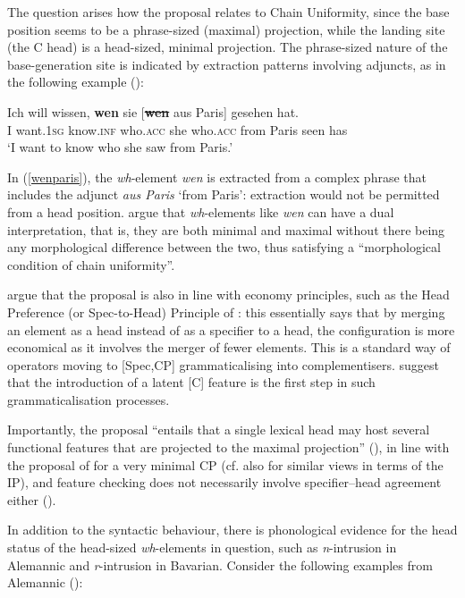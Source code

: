 The question arises how the proposal relates to Chain Uniformity, since the base position seems to be a phrase-sized (maximal) projection, while the landing site (the C head) is a head-sized, minimal projection. The phrase-sized nature of the base-generation site is indicated by extraction patterns involving adjuncts, as in the following example (\citealt[90, ex. 9]{bayerbrandner2008}):

\ea \gll Ich will wissen, \textbf{wen} sie [\sout{\textbf{wen}} aus Paris] gesehen hat. \label{wenparis}\\
I want.\textsc{1sg} know.\textsc{inf} who.\textsc{acc} she \phantom{[}who.\textsc{acc} from Paris seen has\\
\glt `I want to know who she saw from Paris.'
\z

In (\ref{wenparis}), the \textit{wh}-element \textit{wen} is extracted from a complex phrase that includes the adjunct \textit{aus Paris} `from Paris': extraction would not be permitted from a head position. \citet[90--91]{bayerbrandner2008} argue that \textit{wh}-elements like \textit{wen} can have a dual interpretation, that is, they are both minimal and maximal without there being any morphological difference between the two, thus satisfying a ``morphological condition of chain uniformity''.

\citet[91]{bayerbrandner2008} argue that the proposal is also in line with economy principles, such as the Head Preference (or Spec-to-Head) Principle of \citet[10]{vangelderen2004}: this essentially says that by merging an element as a head instead of as a specifier to a head, the configuration is more economical as it involves the merger of fewer elements. This is a standard way of operators moving to [Spec,CP] grammaticalising into complementisers. \citet[91]{bayerbrandner2008} suggest that the introduction of a latent [C] feature is the first step in such grammaticalisation processes.

Importantly, the proposal ``entails that a single lexical head may host several functional features that are projected to the maximal projection'' (\citealt[91]{bayerbrandner2008}), in line with the proposal of \citet{sobin2002} for a very minimal CP (cf. also \citealt{bobaljikthrainsson1998} for similar views in terms of the IP), and feature checking does not necessarily involve specifier--head agreement either (\citealt[91]{sobin2002}).

In addition to the syntactic behaviour, there is phonological evidence for the head status of the head-sized \textit{wh}-elements in question, such as \textit{n}-intrusion in Alemannic and \textit{r}-intrusion in Bavarian. Consider the following examples from Alemannic (\citealt[92, ex. 13a, 14 and 16a]{bayerbrandner2008}):

